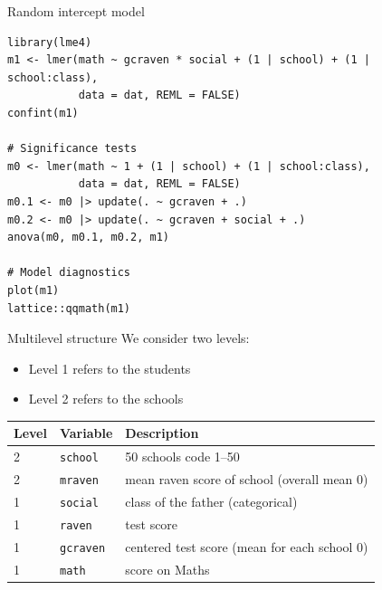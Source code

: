\documentclass[aspectratio=169]{beamer}
\begin{document}
\begin{frame}[fragile]{Random intercept model}
\begin{lstlisting}
library(lme4)
m1 <- lmer(math ~ gcraven * social + (1 | school) + (1 | school:class),
           data = dat, REML = FALSE)
confint(m1)

# Significance tests
m0 <- lmer(math ~ 1 + (1 | school) + (1 | school:class),
           data = dat, REML = FALSE)
m0.1 <- m0 |> update(. ~ gcraven + .)
m0.2 <- m0 |> update(. ~ gcraven + social + .)
anova(m0, m0.1, m0.2, m1)

# Model diagnostics
plot(m1)
lattice::qqmath(m1)
\end{lstlisting}
\end{frame}

\begin{frame}{Multilevel structure}
  We consider two levels:
  \begin{itemize}
    \item Level 1 refers to the students
    \item Level 2 refers to the schools
  \end{itemize}
  \vspace{.5cm}
    \begin{tabular}{llp{8cm}}
      Level & Variable & Description \\
    \hline
      2 & \texttt{school} & 50 schools code 1--50 \\
      2 & \texttt{mraven} & mean raven score of school (overall mean 0) \\
      1 & \texttt{social} & class of the father (categorical) \\
      1 & \texttt{raven} & test score \\
      1 & \texttt{gcraven} & centered test score (mean for each school 0)\\
      1 & \texttt{math} & score on Maths \\
     \hline
  \end{tabular}
\end{frame}
\end{document}
